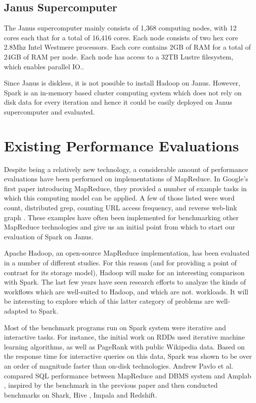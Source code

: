 \documentclass{article}
\begin{document}
\subsection*{Janus Supercomputer}
The Janus supercomputer mainly consists of 1,368 computing nodes, with  12 cores
each that for a total of 16,416 cores. Each node consists of two hex core
2.8Mhz Intel Westmere processors. Each core contains 2GB of RAM for a total of
24GB of RAM per node. Each node has access to a 32TB Lustre filesystem, which
enables parallel IO.\citep{tufo}. 

Since Janus is diskless, it is not possible to install Hadoop on Janus.
However, Spark is an in-memory based cluster computing system which does not
rely on disk data for every iteration and hence it could be easily deployed on
Janus supercomputer and evaluated.

\section*{Existing Performance Evaluations }
Despite being a relatively new technology, a considerable amount of performance
evaluations have been performed on implementations of MapReduce.
In Google's first paper introducing MapReduce, they provided a number of
example tasks in which this computing model can be applied. A few of those listed were
word count, distributed grep, counting URL access frequency, and reverse web-link
graph \citep{dean-mapreduce}. These examples have often been implemented for
benchmarking other MapReduce technologies and give us an initial point from which
to start our evaluation of Spark on Janus.

Apache Hadoop, an open-source MapReduce implementation, has been evaluated in a
number of different studies. For this reason (and for providing a point of
contrast for its storage model), Hadoop will make for an interesting comparison
with Spark. The last few years have seen research efforts to analyze the 
kinds of workflows which are well-suited to Hadoop, and which are not.
\citep{yanpei} workloads. It will be interesting to explore which of
this latter category of problems are well-adapted to Spark.

Most of the benchmark programs run on Spark system were iterative and
interactive tasks. For instance, the initial work on RDDs \citep{zaharia_rdd}
used iterative machine learning algorithms, as well as PageRank with public
Wikipedia data. Based on the response time for interactive queries on
this data, Spark was shown to be over an order of magnitude faster than
on-disk technologies.
Andrew Pavlo et al. \cite{andrew} compared SQL performance between
MapReduce and DBMS system and Amplab \citep{amplab_bench}, inspired by the
benchmark in the previous paper and then conducted benchmarks on Shark,
Hive \citep{ashish}, Impala and Redshift.
\end{document}
